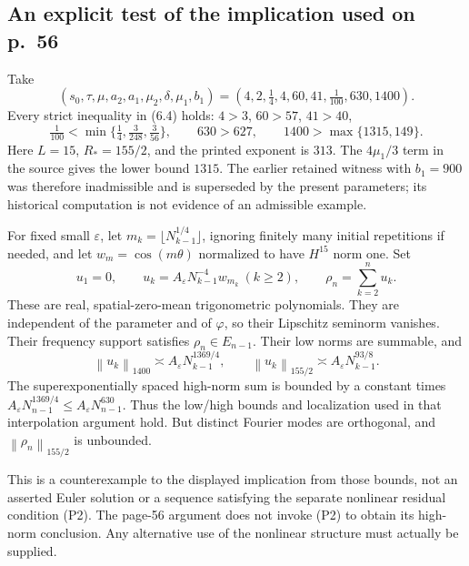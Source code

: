 \documentclass[10pt]{article}
\begin{document}
\subsection*{An explicit test of the implication used on p. 56}
Take \[(s_0,\tau,\mu,a_2,a_1,\mu_2,\delta,\mu_1,b_1)
   =(4,2,\tfrac14,4,60,41,\tfrac1{100},630,1400).\] Every strict inequality in (6.4) holds: \(4>3\), \(60>57\), \(41>40\), \[\tfrac1{100}
 <\min\{\tfrac14,\tfrac3{248},\tfrac3{56}\},\qquad
 630>627,\qquad 1400>\max\{1315,149\}.\] Here \(L=15\), \(R_*=155/2\), and the printed exponent is \(313\). The \(4\mu_1/3\) term in the source gives the lower bound \(1315\). The earlier retained witness with \(b_1=900\) was therefore inadmissible and is superseded by the present parameters; its historical computation is not evidence of an admissible example.\par
For fixed small \(\varepsilon\), let \(m_k=\lfloor N_{k-1}^{1/4}\rfloor\), ignoring finitely many initial repetitions if needed, and let \(w_m=\cos(m\theta)\) normalized to have \(H^{15}\) norm one. Set \[u_1=0,\qquad
 u_k=A_\varepsilon N_{k-1}^{-4}w_{m_k}\ (k\ge2),\qquad
 \rho_n=\sum_{k=2}^n u_k.\] These are real, spatial-zero-mean trigonometric polynomials. They are independent of the parameter and of \(\varphi\), so their Lipschitz seminorm vanishes. Their frequency support satisfies \(\rho_n\in E_{n-1}\). Their low norms are summable, and \[\left\lVert u_k\right\rVert_{1400}\asymp
       A_\varepsilon N_{k-1}^{1369/4},\qquad
 \left\lVert u_k\right\rVert_{155/2}\asymp
       A_\varepsilon N_{k-1}^{93/8}.\] The superexponentially spaced high-norm sum is bounded by a constant times \(A_\varepsilon N_{n-1}^{1369/4}\le A_\varepsilon N_{n-1}^{630}\). Thus the low/high bounds and localization used in that interpolation argument hold. But distinct Fourier modes are orthogonal, and \(\left\lVert \rho_n\right\rVert_{155/2}\) is unbounded.\par
This is a counterexample to the displayed implication from those bounds, not an asserted Euler solution or a sequence satisfying the separate nonlinear residual condition (P2). The page-56 argument does not invoke (P2) to obtain its high-norm conclusion. Any alternative use of the nonlinear structure must actually be supplied.\par
\end{document}
